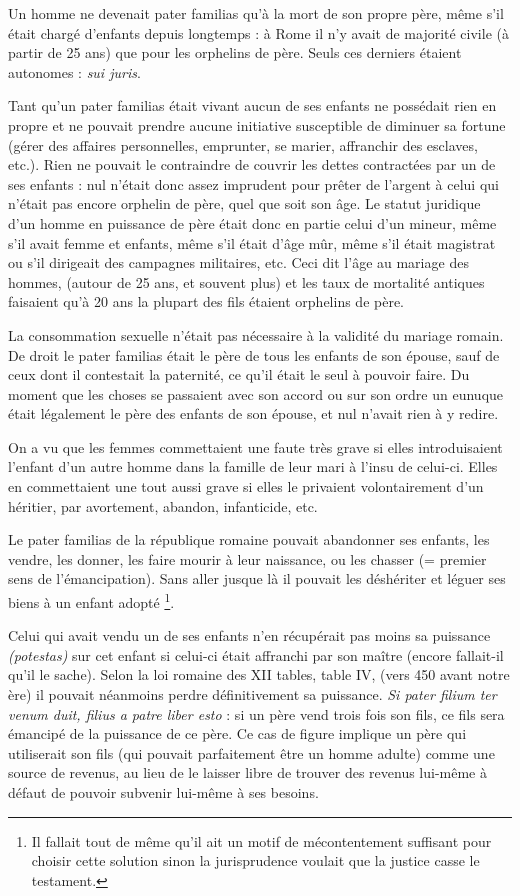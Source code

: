 Un homme ne devenait pater familias qu'à la mort de son propre
père, même s'il était chargé d'enfants depuis longtemps : à Rome il n'y
avait de majorité civile (à partir de 25 ans) que pour les orphelins de père.
Seuls ces derniers étaient autonomes : \emph{sui juris}.

Tant qu'un pater familias était vivant aucun de ses enfants ne possédait
rien en propre et ne pouvait prendre aucune initiative susceptible
de diminuer sa fortune (gérer des affaires personnelles, emprunter, se
marier, affranchir des esclaves, etc.). Rien ne pouvait le contraindre de
couvrir les dettes contractées par un de ses enfants : nul n'était donc assez
imprudent pour prêter de l'argent à celui qui n'était pas encore orphelin
de père, quel que soit son âge. Le statut juridique d'un homme en
puissance de père était donc en partie celui d'un mineur, même s'il avait
femme et enfants, même s'il était d'âge mûr, même s'il était magistrat ou
s'il dirigeait des campagnes militaires, etc. Ceci dit l'âge au mariage des
hommes, (autour de 25 ans, et souvent plus) et les taux de mortalité antiques
faisaient qu'à 20 ans la plupart des fils étaient orphelins de père.

La consommation sexuelle n'était pas nécessaire à la validité du
mariage romain. De droit le pater familias était le père de tous les enfants
de son épouse, sauf de ceux dont il contestait la paternité, ce qu'il était le
seul à pouvoir faire. Du moment que les choses se passaient avec son accord
ou sur son ordre un eunuque était légalement le père des enfants de
son épouse, et nul n'avait rien à y redire.

On a vu que les femmes commettaient une faute très grave si elles
introduisaient l'enfant d'un autre homme dans la famille de leur mari à
l'insu de celui-ci. Elles en commettaient une tout aussi grave si elles le
privaient volontairement d'un héritier, par avortement, abandon, infanticide,
etc.

Le pater familias de la république romaine pouvait abandonner ses
enfants, les vendre, les donner, les faire mourir à leur naissance, ou les
chasser (= premier sens de l'émancipation). Sans aller jusque là il pouvait
les déshériter et léguer ses biens à un enfant adopté%
\footnote{Il fallait tout de même qu'il ait un motif de mécontentement suffisant pour choisir cette solution sinon
la jurisprudence voulait que la justice casse le testament.}.

Celui qui avait vendu un de ses enfants n'en récupérait pas moins
sa puissance \emph{(potestas)} sur cet enfant si celui-ci était affranchi par son maître
(encore fallait-il qu'il le sache). Selon la loi romaine des XII tables, table
IV, (vers 450 avant notre ère) il pouvait néanmoins perdre définitivement
sa puissance. {\emph{Si pater filium ter venum duit, filius a patre liber esto}} :
si un père vend trois fois son fils, ce fils sera émancipé de la puissance de
ce père. Ce cas de figure implique un père qui utiliserait son fils (qui
pouvait parfaitement être un homme adulte) comme une source de revenus,
au lieu de le laisser libre de trouver des revenus lui-même à défaut
de pouvoir subvenir lui-même à ses besoins.

